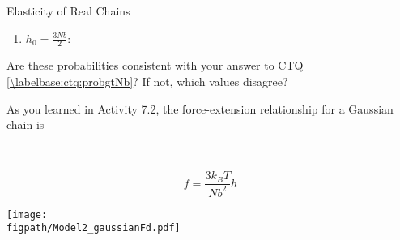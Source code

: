\begin{activity}[extension]{Elasticity of Real Chains}
\begin{ctqs}
\begin{enumerate}
				\item $h_0 = \frac{3Nb}{2}$:
			
				\begin{solution}[0.25in]
				\end{solution}
				
			\end{enumerate}
			
		\question Are these probabilities consistent with your answer to CTQ \ref{\labelbase:ctq:probgtNb}?  If not, which values disagree?
			
				\begin{solution}[1in]
				\end{solution}

\end{ctqs}

	
%	
%	
%	

\begin{model}
\label{\labelbase:mdl:gaussfd}

	As you learned in Activity 7.2, the force-extension relationship for a Gaussian chain is
	
	\begin{minipage}[c]{0.1\textwidth}
		~
	\end{minipage}
	\begin{minipage}[c]{0.3\textwidth}
	\vspace{0pt}
		\begin{equation*}
			f=\frac{3k_BT}{Nb^2}h
		\end{equation*}
	\end{minipage}
	\begin{minipage}[c]{0.5\textwidth}
	\vspace{0pt}
		\centerline{\texttt{[image: \\figpath/Model2\_gaussianFd.pdf]}}
	\end{minipage}
	\begin{minipage}[c]{0.1\textwidth}
		~
	\end{minipage}
	

\end{model}
\end{activity}
